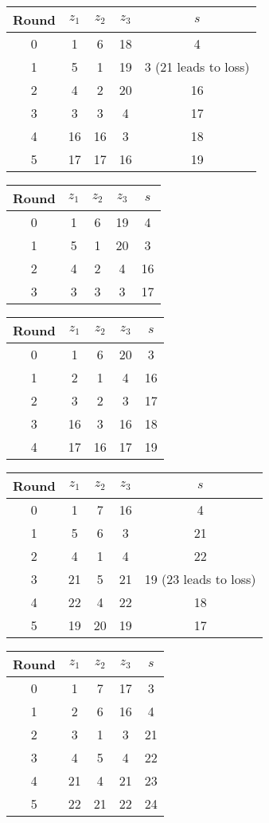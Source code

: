\begin{tabular}{c | c | c | c | c }
Round & $z_1$ & $z_2$ & $z_3$ & $s$ \\
\hline
0 & 1 & 6 & 18 & 4 \\
1 & 5 & 1 & 19 & 3 (21 leads to loss) \\
2 & 4 & 2 & 20 & 16 \\
3 & 3 & 3 & 4 & 17 \\
4 & 16 & 16 & 3 & 18 \\
5 & 17 & 17 & 16 & 19
\end{tabular}

\begin{tabular}{c | c | c | c | c }
Round & $z_1$ & $z_2$ & $z_3$ & $s$ \\
\hline
0 & 1 & 6 & 19 & 4 \\
1 & 5 & 1 & 20 & 3 \\
2 & 4 & 2 & 4 & 16 \\
3 & 3 & 3 & 3 & 17
\end{tabular}

\begin{tabular}{c | c | c | c | c }
Round & $z_1$ & $z_2$ & $z_3$ & $s$ \\
\hline
0 & 1 & 6 & 20 & 3 \\
1 & 2 & 1 & 4 & 16 \\
2 & 3 & 2 & 3 & 17 \\
3 & 16 & 3 & 16 & 18 \\
4 & 17 & 16 & 17 & 19
\end{tabular}

\begin{tabular}{c | c | c | c | c }
Round & $z_1$ & $z_2$ & $z_3$ & $s$ \\
\hline
0 & 1 & 7 & 16 & 4 \\
1 & 5 & 6 & 3 & 21 \\
2 & 4 & 1 & 4 & 22 \\
3 & 21 & 5 & 21 & 19 (23 leads to loss) \\
4 & 22 & 4 & 22 & 18 \\
5 & 19 & 20 & 19 & 17
\end{tabular}

\begin{tabular}{c | c | c | c | c }
Round & $z_1$ & $z_2$ & $z_3$ & $s$ \\
\hline
0 & 1 & 7 & 17 & 3 \\
1 & 2 & 6 & 16 & 4 \\
2 & 3 & 1 & 3 & 21 \\
3 & 4 & 5 & 4 & 22 \\
4 & 21 & 4 & 21 & 23 \\
5 & 22 & 21 & 22 & 24
\end{tabular}

